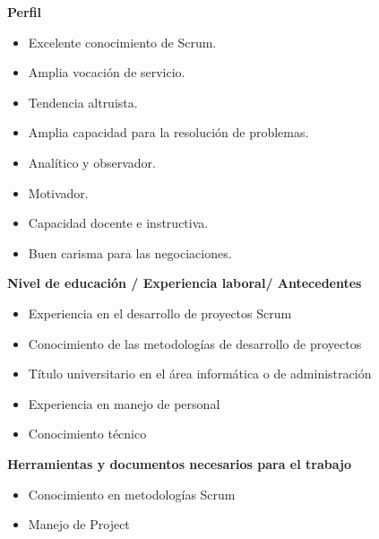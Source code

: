 \begin{itemize}
            \item \textbf{Perfil}
            	\begin{itemize}
                    \item Excelente conocimiento de Scrum.
                    \item Amplia vocación de servicio.
                    \item Tendencia altruista.
                    \item Amplia capacidad para la resolución de problemas.
                    \item Analítico y observador.
                    \item Motivador.
                    \item Capacidad docente e instructiva.
                    \item Buen carisma para las negociaciones.
				\end{itemize}
            {\correccionTexto    
            \item \textbf{Nivel de educación / Experiencia laboral/ Antecedentes}
                \begin{itemize}
                    \item  Experiencia en el desarrollo de proyectos Scrum
					\item Conocimiento de las metodologías de desarrollo de proyectos
					\item Título universitario en el área informática o de administración
					\item Experiencia en manejo de personal
					\item Conocimiento técnico 
                \end{itemize}
            \item \textbf{Herramientas y documentos necesarios para el trabajo}
            	\begin{itemize}
                    \item Conocimiento en metodologías Scrum
                    \item Manejo de Project
                    
                \end{itemize}   
            }
			\end{itemize}
        
        
